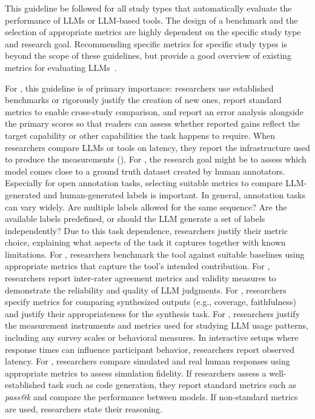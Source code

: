 This guideline \must be followed for all study types that automatically evaluate the performance of LLMs or LLM-based tools.
The design of a benchmark and the selection of appropriate metrics are highly dependent on the specific study type and research goal.
Recommending specific metrics for specific study types is beyond the scope of these guidelines, but \citeauthor{DBLP:journals/corr/abs-2505-08903} provide a good overview of existing metrics for evaluating LLMs~\cite{DBLP:journals/corr/abs-2505-08903}.

For \benchmarkingtasks, this guideline is of primary importance: researchers \must use established benchmarks or rigorously justify the creation of new ones, \must report standard metrics to enable cross-study comparison, and \should report an error analysis alongside the primary scores so that readers can assess whether reported gains reflect the target capability or other capabilities the task happens to require. When researchers compare LLMs or tools on latency, they \must report the infrastructure used to produce the measurements (\design).
For \annotators, the research goal might be to assess which model comes close to a ground truth dataset created by human annotators.
Especially for open annotation tasks, selecting suitable metrics to compare LLM-generated and human-generated labels is important.
In general, annotation tasks can vary widely.
Are multiple labels allowed for the same sequence? Are the available labels predefined, or should the LLM generate a set of labels independently?
Due to this task dependence, researchers \must justify their metric choice, explaining what aspects of the task it captures together with known limitations.
For \newtools, researchers \should benchmark the tool against suitable baselines using appropriate metrics that capture the tool's intended contribution.
For \judges, researchers \should report inter-rater agreement metrics and validity measures to demonstrate the reliability and quality of LLM judgments.
For \synthesis, researchers \should specify metrics for comparing synthesized outputs (e.g., coverage, faithfulness) and justify their appropriateness for the synthesis task.
For \llmusage, researchers \should justify the measurement instruments and metrics used for studying LLM usage patterns, including any survey scales or behavioral measures. In interactive setups where response times can influence participant behavior, researchers \must report observed latency.
For \subjects, researchers \should compare simulated and real human responses using appropriate metrics to assess simulation fidelity.
If researchers assess a well-established task such as code generation, they \should report standard metrics such as \emph{pass@k} and compare the performance between models.
If non-standard metrics are used, researchers \must state their reasoning.

